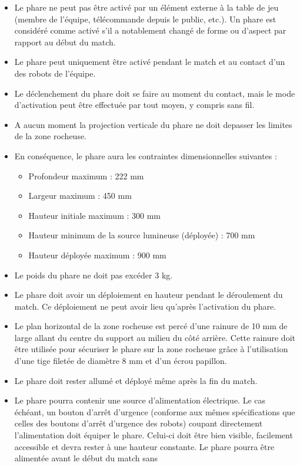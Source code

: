 \documentclass{article}
\begin{document}
\begin{itemize}
\item Le phare ne peut pas être activé par un élément externe à la table de jeu (membre de l’équipe, télécommande
 depuis le public, etc.). Un phare est considéré comme activé s’il a notablement changé de forme
ou d’aspect par rapport au début du match.
\item Le phare peut uniquement être activé pendant le match et au contact d’un des robots de l’équipe.
\item Le déclenchement du phare doit se faire au moment du contact, mais le mode d’activation peut être
effectuée par tout moyen, y compris sans fil.
\item A aucun moment la projection verticale du phare ne doit depasser les limites de la zone rocheuse.
\item En conséquence, le phare aura les contraintes dimensionnelles suivantes :
    \begin{itemize}
    \item Profondeur maximum : 222 mm
    \item Largeur maximum : 450 mm
    \item Hauteur initiale maximum : 300 mm
    \item Hauteur minimum de la source lumineuse (déployée) : 700 mm
    \item Hauteur déployée maximum : 900 mm
    \end{itemize}
\item Le poids du phare ne doit pas excéder 3 kg.
\item Le phare doit avoir un déploiement en hauteur pendant le déroulement du match. Ce déploiement ne
peut avoir lieu qu’après l’activation du phare.
\item Le plan horizontal de la zone rocheuse est percé d’une rainure de 10 mm de large allant du centre du
support au milieu du côté arrière. Cette rainure doit être utilisée pour sécuriser le phare sur la zone
rocheuse grâce à l’utilisation d’une tige filetée de diamètre 8 mm et d’un écrou papillon.
\item Le phare doit rester allumé et déployé même après la fin du match.
\item Le phare pourra contenir une source d’alimentation électrique. Le cas échéant, un bouton d’arrêt d’urgence
 (conforme aux mêmes spécifications que celles des boutons d’arrêt d’urgence des robots) coupant
directement l’alimentation doit équiper le phare. Celui-ci doit être bien visible, facilement accessible et
devra rester à une hauteur constante. Le phare pourra être alimentée avant le début du match sans

\end{itemize}
\end{document}
